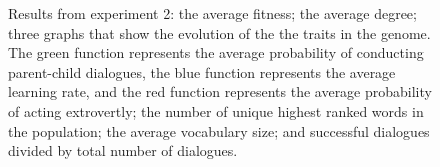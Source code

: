 \begin{figure}[b]\setcounter{subfigure}{0}
    \centering
    \hfill
    \caption[Graphs of the results from experiment 2 as a function of number of generations.]{Results from experiment 2:  the average fitness;  the average degree;  three graphs that show the evolution of the the traits in the genome. The green function represents the average probability of conducting parent-child dialogues, the blue function represents the average learning rate, and the red function represents the average probability of acting extrovertly;  the number of unique highest ranked words in the population;  the average vocabulary size; and  successful dialogues divided by total number of dialogues.}
    \label{fig:exp2.0}
\end{figure}
%
